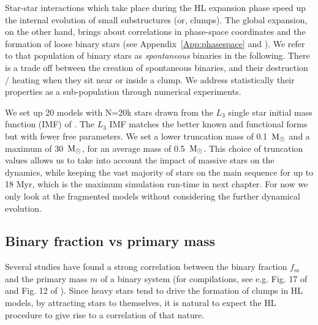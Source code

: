 Star-star interactions which take place during the HL expansion phase speed up the internal evolution of small substructures (or, clumps). The global expansion, on the other hand, brings about correlations in phase-space coordinates and the formation of loose binary stars (see Appendix~\ref{App:phasespace} and \citealt{Kouwenhoven2010,Moeckel2011}). We refer to that population of binary stars as {\it spontaneous} binaries in the following. There is a trade off between the creation of spontaneous binaries, and their destruction / heating when they sit near or inside a clump. We address statistically their properties as a sub-population through numerical experiments.

We set up 20 models with N=20k stars drawn from the $L_3$ single star initial mass function (IMF) of \cite{Maschberger2013}. The $L_3$ IMF  matches the better known \cite{Kroupa2001a} and \cite{Chabrier2003} functional forms but with fewer free parameters. We set a lower truncation mass of 0.1~${\textrm{M}_\odot}$ and a maximum of 30~${\textrm{M}_\odot}$, for an average mass of 0.5~${\textrm{M}_\odot}$. This choice of truncation values allows us to take into account the impact of massive stars on the dynamics, while keeping the vast majority of stars on the main sequence for up to 18 Myr, which is the maximum simulation run-time in next chapter. For now we only look at the fragmented models without considering the further dynamical evolution.


\subsection{Binary fraction vs primary mass}
\label{Sub:spontaneous_binaryfractions}

Several studies have found a strong correlation between the binary fraction $f_m$ and the primary mass $m$ of a binary system (for compilations, see e.g. Fig. 17 of \citealt{Bate2012} and Fig. 12 of \citealt{Raghavan2010}). Since heavy stars tend to drive the formation of clumps in HL models, by attracting stars to themselves, it is natural to expect the HL procedure to give rise to a correlation of that nature.  



